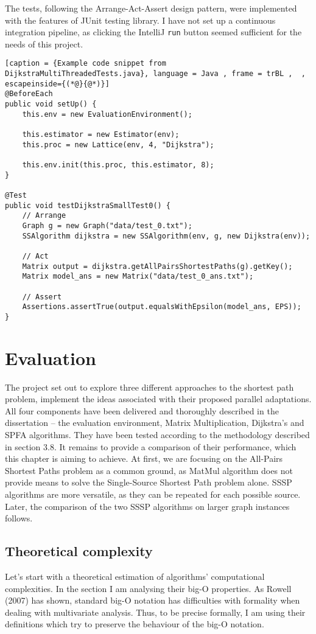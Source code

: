 \documentclass[12pt,a4paper,oneside,openright]{report}
\begin{document}
The tests, following the Arrange-Act-Assert design pattern, were implemented with the features of JUnit testing library. I have not set up a continuous integration pipeline, as clicking the IntelliJ \texttt{run} button seemed sufficient for the needs of this project.

\begin{lstlisting}[caption = {Example code snippet from DijkstraMultiThreadedTests.java}, language = Java , frame = trBL ,  , escapeinside={(*@}{@*)}]
@BeforeEach
public void setUp() {
    this.env = new EvaluationEnvironment();
    
    this.estimator = new Estimator(env);
    this.proc = new Lattice(env, 4, "Dijkstra");
    
    this.env.init(this.proc, this.estimator, 8);
}
    
@Test
public void testDijkstraSmallTest0() {
    // Arrange
    Graph g = new Graph("data/test_0.txt");
    SSAlgorithm dijkstra = new SSAlgorithm(env, g, new Dijkstra(env));

    // Act
    Matrix output = dijkstra.getAllPairsShortestPaths(g).getKey();
    Matrix model_ans = new Matrix("data/test_0_ans.txt");

    // Assert
    Assertions.assertTrue(output.equalsWithEpsilon(model_ans, EPS));
}

\end{lstlisting}
\chapter{Evaluation}
The project set out to explore three different approaches to the shortest path problem, implement the ideas associated with their proposed parallel adaptations. All four components have been delivered and thoroughly described in the dissertation -- the evaluation environment, Matrix Multiplication, Dijkstra's and SPFA algorithms. They have been tested according to the methodology described in section 3.8. It remains to provide a comparison of their performance, which this chapter is aiming to achieve. At first, we are focusing on the All-Pairs Shortest Paths problem as a common ground, as MatMul algorithm does not provide means to solve the Single-Source Shortest Path problem alone. SSSP algorithms are more versatile, as they can be repeated for each possible source. Later, the comparison of the two SSSP algorithms on larger graph instances follows.

\section{Theoretical complexity}
Let's start with a theoretical estimation of algorithms' computational complexities. In the section I am analysing their big-O properties. As Rowell (2007) \cite{asymptotic} has shown, standard big-O notation has difficulties with formality when dealing with multivariate analysis. Thus, to be precise formally, I am using their definitions which try to preserve the behaviour of the big-O notation. 
\end{document}
